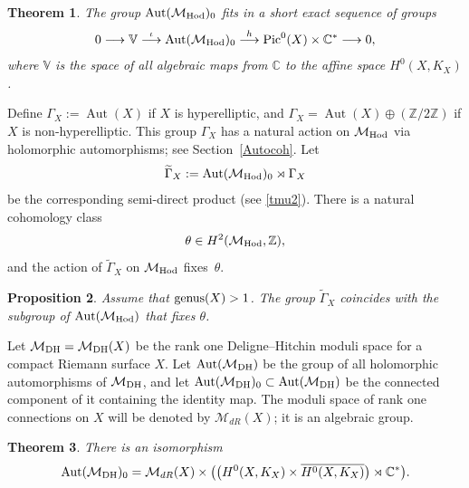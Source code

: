 \documentclass[pdftex]{sigma}
\numberwithin{equation}{section}
\newtheorem{Theorem}{Theorem}[section]
\newtheorem{Proposition}[Theorem]{Proposition}
 { \theoremstyle{definition}
\newtheorem{Definition}[Theorem]{Definition}
\newtheorem{Remark}[Theorem]{Remark} }
\begin{document}
\begin{Theorem}\label{ti1} The group $\operatorname{Aut}({\mathcal M}_{\rm Hod})_0$ fits in a short exact sequence of groups
\begin{gather*}
0 \longrightarrow {\mathbb V} \stackrel{\iota}{\longrightarrow} \operatorname{Aut}({\mathcal M}_{\rm Hod})_0 \stackrel{h}{\longrightarrow}
\operatorname{Pic}^0(X)\times {\mathbb C}^* \longrightarrow 0 ,
\end{gather*}
where ${\mathbb V}$ is the space of all algebraic maps from $\mathbb C$ to the affine space $H^0(X, K_X)$.
\end{Theorem}

Def\/ine $\Gamma_X := \operatorname{Aut}(X)$ if $X$ is hyperelliptic, and $\Gamma_X = \operatorname{Aut}(X)\oplus ({\mathbb Z}/2{\mathbb Z})$ if $X$ is non-hyperelliptic. This group $\Gamma_X$ has a natural action on ${\mathcal M}_{\rm Hod}$ via holomorphic automorphisms; see Section~\ref{Autocoh}. Let
\begin{gather*}
\widetilde{\Gamma}_X := \operatorname{Aut}({\mathcal M}_{\rm Hod})_0\rtimes \Gamma_X
\end{gather*}
be the corresponding semi-direct product (see \eqref{tmu2}). There is a natural cohomology class
\begin{gather*}
\theta \in H^2({\mathcal M}_{\rm Hod}, {\mathbb Z}) ,
\end{gather*}
and the action of $\widetilde{\Gamma}_X$ on ${\mathcal M}_{\rm Hod}$ f\/ixes~$\theta$.

\begin{Proposition} Assume that ${\rm genus}(X) > 1$. The group $\widetilde{\Gamma}_X$ coincides with the subgroup of $\operatorname{Aut}({\mathcal M}_{\rm Hod})$ that fixes $\theta$.
\end{Proposition}

Let ${\mathcal M}_{\rm DH} = {\mathcal M}_{\rm DH}(X)$ be the rank one Deligne--Hitchin moduli space for a compact Riemann surface $X$. Let $\operatorname{Aut}({\mathcal M}_{\rm DH})$ be the group of all holomorphic automorphisms of ${\mathcal M}_{\rm DH}$, and let $\operatorname{Aut}({\mathcal M}_{\rm DH})_0 \subset \operatorname{Aut}({\mathcal M}_{\rm DH})$ be the connected component of it containing the identity map. The moduli space of rank one connections on $X$ will be denoted by ${\mathcal M}_{dR}(X)$; it is an algebraic group.

\begin{Theorem}\label{ti2}
There is an isomorphism
\begin{gather*}\operatorname{Aut}({\mathcal M}_{\rm DH})_0 = \mathcal M_{dR}(X)\times \big(\big(H^0(X, K_X)\times\overline{H^0(X, K_X)}\big)\rtimes \mathbb C^*\big) .\end{gather*}
\end{Theorem}
\end{document}

